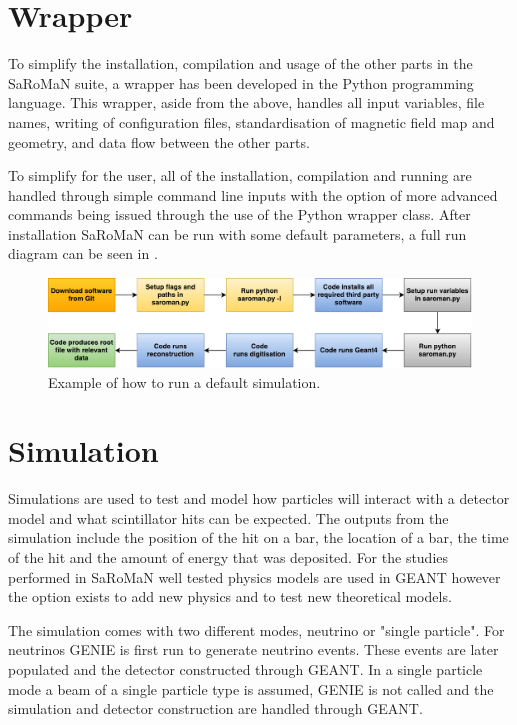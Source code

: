 \section{Wrapper}
To simplify the installation, compilation and usage of the other parts in the SaRoMaN suite, a wrapper has been developed in the Python programming language. This wrapper, aside from the above, handles all input variables, file names, writing of configuration files, standardisation of magnetic field map and geometry, and data flow between the other parts. 

To simplify for the user, all of the installation, compilation and running are handled through simple command line inputs with the option of more advanced commands being issued through the use of the Python wrapper class. After installation SaRoMaN can be run with some default parameters, a full run diagram can be seen in .

\begin{figure}[h!]
\centering
\includegraphics[width=\textwidth]{figures/block.pdf}
\caption{Example of how to run a default simulation.}
\label{fig:block}
\end{figure}

\pagebreak
\section{Simulation}
Simulations are used to test and model how particles will interact with a detector model and what scintillator hits can be expected. The outputs from the simulation include the position of the hit on a bar, the location of a bar, the time of the hit and the amount of energy that was deposited. For the studies performed in SaRoMaN well tested physics models are used in GEANT however the option exists to add new physics and to test new theoretical models.

The simulation comes with two different modes, neutrino or "single particle". For neutrinos GENIE is first run to generate neutrino events. These events are later populated and the detector constructed through GEANT. In a single particle mode a beam of a single particle type is assumed, GENIE is not called and the simulation and detector construction are handled through GEANT.

